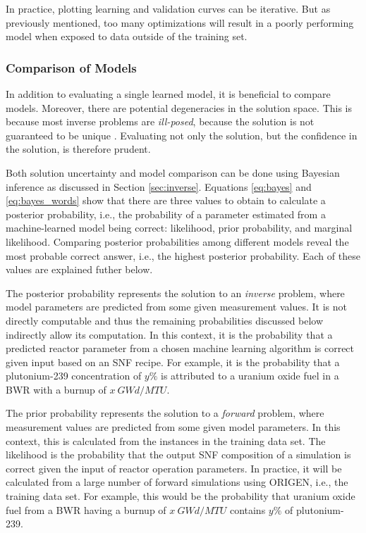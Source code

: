 In practice, plotting learning and validation curves can be iterative. But as
previously mentioned, too many optimizations will result in a poorly performing
model when exposed to data outside of the training set.

\subsubsection{Comparison of Models}
\label{sec:invcompare}

In addition to evaluating a single learned model, it is beneficial to compare
models. Moreover, there are potential degeneracies in the solution space. This
is because most inverse problems are \textit{ill-posed}, because the solution
is not guaranteed to be unique \cite{skutnik_2016}.  Evaluating not only the
solution, but the confidence in the solution, is therefore prudent.

Both solution uncertainty and model comparison can be done using Bayesian
inference as discussed in Section \ref{sec:inverse}.  Equations \ref{eq:bayes}
and \ref{eq:bayes_words} show that there are three values to obtain to
calculate a posterior probability, i.e., the probability of a parameter
estimated from a machine-learned model being correct: likelihood, prior
probability, and marginal likelihood.  Comparing posterior probabilities among
different models reveal the most probable correct answer, i.e., the highest
posterior probability.  \cite{inverse_theory, gentle_bayes} Each of these
values are explained futher below.

The posterior probability represents the solution to an \textit{inverse}
problem, where model parameters are predicted from some given measurement
values. It is not directly computable and thus the remaining probabilities
discussed below indirectly allow its computation.  In this context, it is the
probability that a predicted reactor parameter from a chosen machine learning
algorithm is correct given input based on an \gls{SNF} recipe.  For example, it
is the probability that a plutonium-239 concentration of $y\%$ is attributed to
a uranium oxide fuel in a \gls{BWR} with a burnup of $x\ GWd/MTU$.  

The prior probability represents the solution to a \textit{forward} problem,
where measurement values are predicted from some given model parameters.  In
this context, this is calculated from the instances in the training data set.
The likelihood is the probability that the output \gls{SNF} composition of a
simulation is correct given the input of reactor operation parameters.  In
practice, it will be calculated from a large number of forward simulations
using \gls{ORIGEN}, i.e., the training data set. For example, this would be the
probability that uranium oxide fuel from a \gls{BWR} having a burnup of $x\
GWd/MTU$ contains $y\%$ of plutonium-239.

